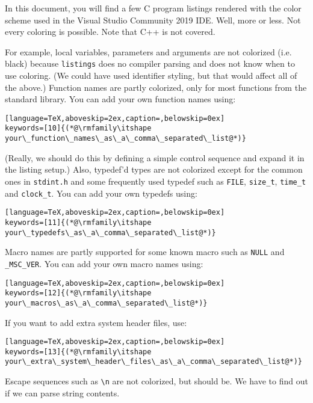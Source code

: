 \documentclass[a4paper,12pt]{article}
\begin{document}
In this document, you will find a few C program listings rendered with the color scheme used in the Visual Studio Community 2019 IDE. Well, more or less. Not every coloring is possible. Note that C++ is not covered.

For example, local variables, parameters and arguments are not colorized (i.e. black) because \texttt{listings} does no compiler parsing and does not know when to use coloring. (We could have used identifier styling, but that would affect all of the above.) Function names are partly colorized, only for most functions from the standard library. You can add your own function names using:

\begin{lstlisting}[language=TeX,aboveskip=2ex,caption=,belowskip=0ex]
keywords=[10]{(*@\rmfamily\itshape your\_function\_names\_as\_a\_comma\_separated\_list@*)}
\end{lstlisting}

(Really, we should do this by defining a simple control sequence and expand it in the listing setup.)
Also, typedef'd types are not colorized except for the common ones in \texttt{stdint.h} and some frequently used typedef such as \lstinline|FILE|, \lstinline|size_t|, \lstinline|time_t| and \lstinline|clock_t|. You can add your own typedefs using:

\begin{lstlisting}[language=TeX,aboveskip=2ex,caption=,belowskip=0ex]
keywords=[11]{(*@\rmfamily\itshape your\_typedefs\_as\_a\_comma\_separated\_list@*)}
\end{lstlisting}

Macro names are partly supported for some known macro such as \lstinline|NULL| and \lstinline|_MSC_VER|. You can add your own macro names using:

\begin{lstlisting}[language=TeX,aboveskip=2ex,caption=,belowskip=0ex]
keywords=[12]{(*@\rmfamily\itshape your\_macros\_as\_a\_comma\_separated\_list@*)}
\end{lstlisting}

If you want to add extra system header files, use:

\begin{lstlisting}[language=TeX,aboveskip=2ex,caption=,belowskip=0ex]
keywords=[13]{(*@\rmfamily\itshape your\_extra\_system\_header\_files\_as\_a\_comma\_separated\_list@*)}
\end{lstlisting}


Escape sequences such as \lstinline|\n| are not colorized, but should be. We have to find out if we can parse string contents.
\end{document}
